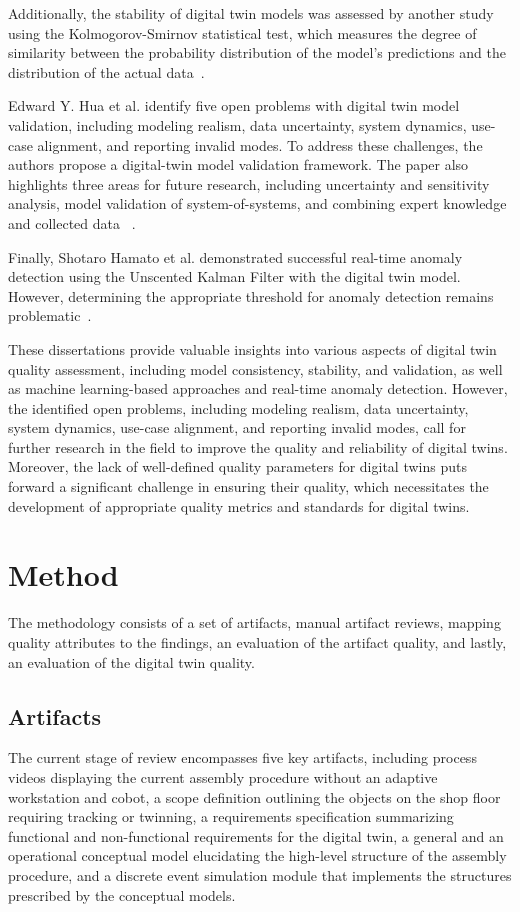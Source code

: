 \documentclass{llncs}
\begin{document}
    Additionally, the stability of digital twin models was assessed by another study using the Kolmogorov-Smirnov statistical test, 
    which measures the degree of similarity between the probability distribution of the model's predictions and the distribution of the actual data~\cite{RadarDigitalTwin}.

    Edward Y. Hua et al. identify five open problems with digital twin model validation, including modeling realism, data uncertainty, system dynamics, use-case alignment, and reporting invalid modes.
    To address these challenges, the authors propose a digital-twin model validation framework. The paper also highlights three areas for future research, 
    including uncertainty and sensitivity analysis, model validation of system-of-systems, and combining expert knowledge and collected data ~\cite{ValidationofDigitalTwins}. 

    Finally, Shotaro Hamato et al. demonstrated successful real-time anomaly detection using the Unscented Kalman Filter with the digital twin model. 
    However, determining the appropriate threshold for anomaly detection remains problematic~\cite{JapeneseKalmanFilterCorrectness}.

    These dissertations provide valuable insights into various aspects of digital twin quality assessment, including model consistency, stability, and validation, as well as machine learning-based approaches and real-time anomaly detection. 
    However, the identified open problems, including modeling realism, data uncertainty, system dynamics, use-case alignment, and reporting invalid modes, call for further research in the field to improve the quality and reliability of digital twins. Moreover, 
    the lack of well-defined quality parameters for digital twins puts forward a significant challenge in ensuring their quality, which necessitates the development of appropriate quality metrics and standards for digital twins.
  
    \section{Method}
    The methodology consists of a set of artifacts, manual artifact reviews, mapping quality attributes to the findings, an evaluation of the artifact quality, and lastly, an evaluation of the digital twin quality.   
    \subsection{Artifacts}\label{section:Artifacts}
    The current stage of review encompasses five key artifacts, including process videos displaying the current assembly procedure without an adaptive workstation and cobot, a scope definition outlining the objects on the shop floor requiring tracking or twinning, a requirements specification summarizing functional and non-functional requirements for the digital twin, a general and an operational conceptual model elucidating the high-level structure of the assembly procedure, 
    and a discrete event simulation module that implements the structures prescribed by the conceptual models.
\end{document}

